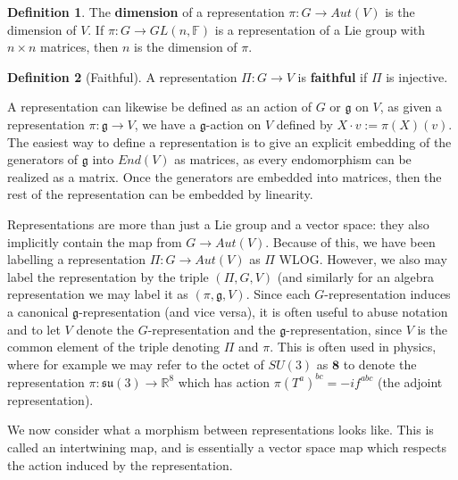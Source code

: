 \documentclass[11pt, oneside]{article}   	%
\theoremstyle{definition}
\newtheorem{definition}{Definition}[section]
\begin{document}
\begin{definition}
	The \textbf{dimension} of a representation $\pi : G\rightarrow Aut(V)$ is the dimension of $V$. 
	If $\pi : G\rightarrow GL(n, \mathbb F)$ is a representation of a Lie group with $n\times n$ matrices, 
	then $n$ is the dimension of $\pi$. 
\end{definition}

\begin{definition}[Faithful]
	A representation $\Pi : G\rightarrow V$ is \textbf{faithful} if $\Pi$ is injective. 
\end{definition}

A representation can likewise be defined as an action of $G$ or $\mathfrak g$ on $V$, as given a 
representation $\pi : \mathfrak g\rightarrow V$, we have a $\mathfrak g$-action on $V$ defined 
by $X\cdot v := \pi(X)(v)$. The easiest way to define a representation is to give an explicit 
embedding of the generators of $\mathfrak g$ into $End(V)$ as matrices, as every endomorphism 
can be realized as a matrix. Once the generators are embedded into matrices, then the rest of 
the representation can be embedded by linearity. 

Representations are more than just a Lie group and a vector space: they also implicitly contain the 
map from $G\rightarrow Aut(V)$. Because of this, we have been labelling a representation $\Pi : G\rightarrow 
Aut(V)$ as $\Pi$ WLOG. However, we also may label the representation by the triple $(\Pi, G, V)$ 
(and similarly for an algebra representation we may label it as $(\pi, \mathfrak g, V)$. Since each 
$G$-representation induces a canonical $\mathfrak g$-representation (and vice versa), it is often 
useful to abuse notation and to let $V$ denote the $G$-representation and the $\mathfrak g$-representation, 
since $V$ is the common element of the triple denoting $\Pi$ and $\pi$. This is often used in physics, where 
for example we may refer to the octet of $SU(3)$ as $\textbf{8}$ to denote the representation $\pi : \mathfrak{su}(3)
\rightarrow\mathbb R^8$ which has action $\pi(T^a)^{bc} = - if^{abc}$ (the adjoint representation). 

We now consider what a morphism between representations looks like. This is called an intertwining map, and 
is essentially a vector space map which respects the action induced by the representation. 
\end{document}
